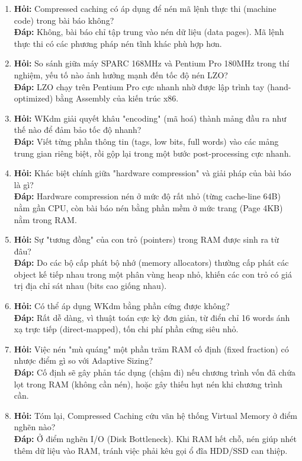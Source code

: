 \documentclass[12pt,a4paper]{article}
\begin{document}
\begin{enumerate}
    \item \textbf{Hỏi:} Compressed caching có áp dụng để nén mã lệnh thực thi (machine code) trong bài báo không? \\
    \textbf{Đáp:} Không, bài báo chỉ tập trung vào nén dữ liệu (data pages). Mã lệnh thực thi có các phương pháp nén tĩnh khác phù hợp hơn.
    
    \item \textbf{Hỏi:} So sánh giữa máy SPARC 168MHz và Pentium Pro 180MHz trong thí nghiệm, yếu tố nào ảnh hưởng mạnh đến tốc độ nén LZO? \\
    \textbf{Đáp:} LZO chạy trên Pentium Pro cực nhanh nhờ được lập trình tay (hand-optimized) bằng Assembly của kiến trúc x86.
    
    \item \textbf{Hỏi:} WKdm giải quyết khâu "encoding" (mã hoá) thành mảng đầu ra như thế nào để đảm bảo tốc độ nhanh? \\
    \textbf{Đáp:} Viết từng phần thông tin (tags, low bits, full words) vào các mảng trung gian riêng biệt, rồi gộp lại trong một bước post-processing cực nhanh.
    
    \item \textbf{Hỏi:} Khác biệt chính giữa "hardware compression" và giải pháp của bài báo là gì? \\
    \textbf{Đáp:} Hardware compression nén ở mức độ rất nhỏ (từng cache-line 64B) nằm gần CPU, còn bài báo nén bằng phần mềm ở mức trang (Page 4KB) nằm trong RAM.
    
    \item \textbf{Hỏi:} Sự "tương đồng" của con trỏ (pointers) trong RAM được sinh ra từ đâu? \\
    \textbf{Đáp:} Do các bộ cấp phát bộ nhớ (memory allocators) thường cấp phát các object kế tiếp nhau trong một phân vùng heap nhỏ, khiến các con trỏ có giá trị địa chỉ sát nhau (bits cao giống nhau).
    
    \item \textbf{Hỏi:} Có thể áp dụng WKdm bằng phần cứng được không? \\
    \textbf{Đáp:} Rất dễ dàng, vì thuật toán cực kỳ đơn giản, từ điển chỉ 16 words ánh xạ trực tiếp (direct-mapped), tốn chi phí phần cứng siêu nhỏ.
    
    \item \textbf{Hỏi:} Việc nén "mù quáng" một phần trăm RAM cố định (fixed fraction) có nhược điểm gì so với Adaptive Sizing? \\
    \textbf{Đáp:} Cố định sẽ gây phản tác dụng (chậm đi) nếu chương trình vốn đã chứa lọt trong RAM (không cần nén), hoặc gây thiếu hụt nén khi chương trình cần.
    
    \item \textbf{Hỏi:} Tóm lại, Compressed Caching cứu vãn hệ thống Virtual Memory ở điểm nghẽn nào? \\
    \textbf{Đáp:} Ở điểm nghẽn I/O (Disk Bottleneck). Khi RAM hết chỗ, nén giúp nhét thêm dữ liệu vào RAM, tránh việc phải kêu gọi ổ đĩa HDD/SSD can thiệp.
\end{enumerate}

\end{document}
